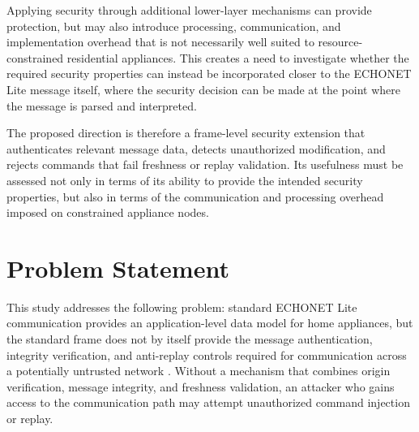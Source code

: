 Applying security through additional lower-layer mechanisms can provide protection, but may also introduce processing, communication, and implementation overhead that is not necessarily well suited to resource-constrained residential appliances. This creates a need to investigate whether the required security properties can instead be incorporated closer to the ECHONET Lite message itself, where the security decision can be made at the point where the message is parsed and interpreted.

The proposed direction is therefore a frame-level security extension that authenticates relevant message data, detects unauthorized modification, and rejects commands that fail freshness or replay validation. Its usefulness must be assessed not only in terms of its ability to provide the intended security properties, but also in terms of the communication and processing overhead imposed on constrained appliance nodes.




\section{Problem Statement}

This study addresses the following problem: standard ECHONET Lite communication provides an application-level data model for home appliances, but the standard frame does not by itself provide the message authentication, integrity verification, and anti-replay controls required for communication across a potentially untrusted network \citep{ECHONETPart2,eissaDevelopingIncentiveDemand2019}. Without a mechanism that combines origin verification, message integrity, and freshness validation, an attacker who gains access to the communication path may attempt unauthorized command injection or replay.

